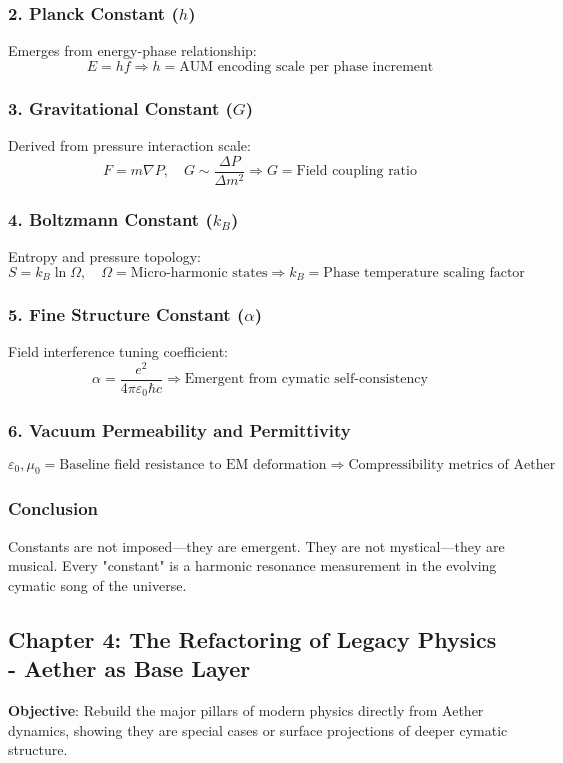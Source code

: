 \subsubsection*{2. Planck Constant (\( h \))}
Emerges from energy-phase relationship:
\[
E = h f \Rightarrow h = \text{AUM encoding scale per phase increment}
\]

\subsubsection*{3. Gravitational Constant (\( G \))}
Derived from pressure interaction scale:
\[
F = m \nabla P, \quad G \sim \frac{\Delta P}{\Delta m^2} \Rightarrow G = \text{Field coupling ratio}
\]

\subsubsection*{4. Boltzmann Constant (\( k_B \))}
Entropy and pressure topology:
\[
S = k_B \ln \Omega, \quad \Omega = \text{Micro-harmonic states} \Rightarrow k_B = \text{Phase temperature scaling factor}
\]

\subsubsection*{5. Fine Structure Constant (\( \alpha \))}
Field interference tuning coefficient:
\[
\alpha = \frac{e^2}{4 \pi \varepsilon_0 \hbar c} \Rightarrow \text{Emergent from cymatic self-consistency}
\]

\subsubsection*{6. Vacuum Permeability and Permittivity}
\[
\varepsilon_0, \mu_0 = \text{Baseline field resistance to EM deformation} \Rightarrow \text{Compressibility metrics of Aether}
\]

\subsubsection*{Conclusion}
Constants are not imposed—they are emergent. They are not mystical—they are musical. Every "constant" is a harmonic resonance measurement in the evolving cymatic song of the universe.

\subsection{Chapter 4: The Refactoring of Legacy Physics - Aether as Base Layer}
\textbf{Objective}: Rebuild the major pillars of modern physics directly from Aether dynamics, showing they are special cases or surface projections of deeper cymatic structure.

